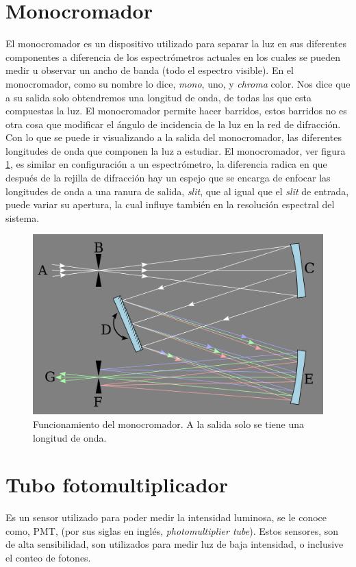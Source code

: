 \section{Monocromador}
El monocromador es un dispositivo utilizado para separar la luz en sus diferentes componentes a diferencia de los espectrómetros actuales en los cuales se pueden medir u observar un ancho de banda (todo el espectro visible). En el monocromador, como su nombre lo dice, \textit{mono}, uno, y \textit{chroma} color. Nos dice que a su salida solo obtendremos una longitud de onda, de todas las que esta compuestas la luz.
El monocromador permite hacer barridos, estos barridos no es otra cosa que modificar el
ángulo de incidencia de la luz en la red de difracción. Con lo que se puede ir visualizando a la salida del monocromador, las diferentes longitudes de onda que componen la luz a estudiar. El monocromador, ver figura \ref{fig:1280px-czerny-turnermonochromator}, es similar en configuración a un espectrómetro, la diferencia radica en que después de la rejilla de difracción hay un espejo que se encarga de enfocar las longitudes de onda a una ranura de salida, \textit{slit}, que al igual que el \textit{slit} de entrada, puede variar su apertura, la cual influye también en la resolución espectral del sistema.
\begin{figure}[h]
	\centering
	\includegraphics[width=0.4\linewidth]{Imagenes/1280px-Czerny-Turner_Monochromator}
	\caption{Funcionamiento del monocromador. A la salida solo se tiene una longitud de onda. \cite{Czerny-Turney-Conf}}
	\label{fig:1280px-czerny-turnermonochromator}
	
\end{figure}



\section{Tubo fotomultiplicador}
Es un sensor utilizado para poder medir la intensidad luminosa, se le conoce como, PMT, (por sus siglas en inglés, \textit{photomultiplier tube}). Estos sensores, son de alta sensibilidad, son utilizados para medir luz de baja intensidad, o inclusive el conteo de fotones. 

